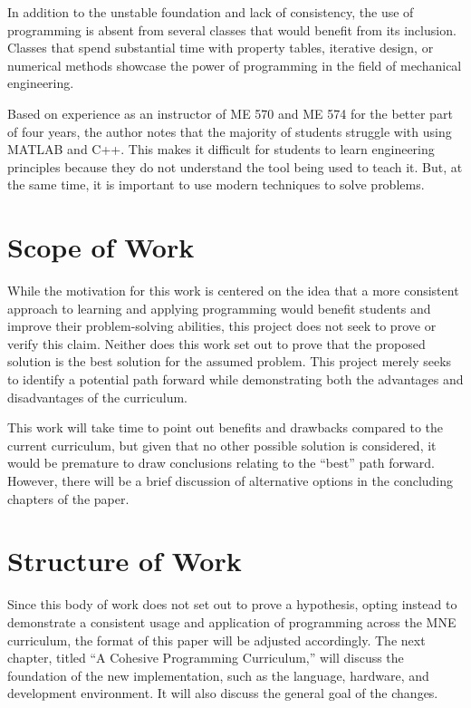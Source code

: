 In addition to the unstable foundation and lack of consistency, the use of programming is 
absent from several classes that would benefit from its inclusion. Classes that spend
substantial time with property tables, iterative design, or numerical methods
showcase the power of programming in the field of mechanical engineering. 

Based on experience as an instructor of ME 570 and ME 574 for the better part of 
four years, the author notes that the majority of students struggle with using MATLAB and C++. This makes it 
difficult for students to learn engineering principles because they do not understand 
the tool being used to teach it. But, at the same time, it is important to use modern
techniques to solve problems.

\section{Scope of Work}

While the motivation for this work is centered on the idea that a more consistent approach to
learning and applying programming would benefit students and improve their problem-solving
abilities, this project does not seek to prove or verify this claim. Neither does this
work set out to prove that the proposed solution is the best solution for the assumed
problem. This project merely seeks to identify a potential path forward while 
demonstrating both the advantages and disadvantages of the curriculum. 

This work will take time to point out benefits and drawbacks compared to the current 
curriculum, but given that no other possible solution is considered, it would be
premature to draw conclusions relating to the ``best'' path forward. However, there 
will be a brief discussion of alternative options in the concluding chapters of the paper.

\section{Structure of Work}

Since this body of work does not set out to prove a hypothesis, opting instead to demonstrate
a consistent usage and application of programming across the MNE curriculum, the format of
this paper will be adjusted accordingly. The next chapter, titled ``A Cohesive Programming
Curriculum,'' will discuss the foundation of the new implementation, such as the language,
hardware, and development environment. It will also discuss the general goal of the changes.

